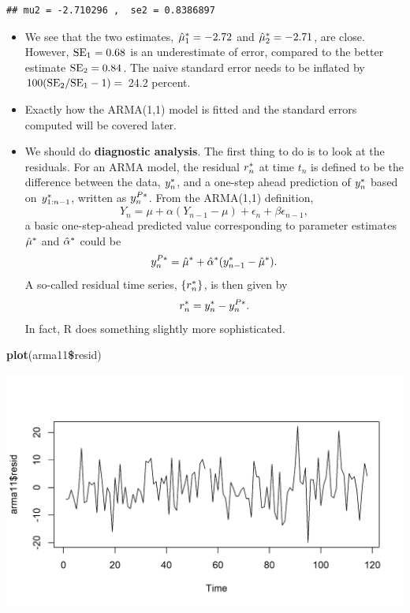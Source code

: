 \documentclass[]{article}
\newenvironment{Shaded}{\begin{snugshade}}{\end{snugshade}}
\newcommand{\KeywordTok}[1]{\textcolor[rgb]{0.13,0.29,0.53}{\textbf{#1}}}
\newcommand{\OperatorTok}[1]{\textcolor[rgb]{0.81,0.36,0.00}{\textbf{#1}}}
\newcommand{\NormalTok}[1]{#1}
\begin{document}
\begin{verbatim}
## mu2 = -2.710296 ,  se2 = 0.8386897
\end{verbatim}

\begin{itemize}
\item
  We see that the two estimates, \(\hat\mu_1^*=-2.72\) and
  \(\hat\mu_2^*=-2.71\), are close. However, \(\mathrm{SE}_1=0.68\) is
  an underestimate of error, compared to the better estimate
  \(\mathrm{SE}_2=0.84\). The naive standard error needs to be inflated by
  \(100(\mathrm{SE}_2/\mathrm{SE}_1-1)=\) 24.2 percent.
\item
  Exactly how the ARMA(1,1) model is fitted and the standard errors
  computed will be covered later.
\item
  We should do \textbf{diagnostic analysis}. The first thing to do is to
  look at the residuals. For an ARMA model, the residual \(r_n^*\)
  at time \(t_n\) is defined to be the difference between the data,
  \(y_n^*\), and a one-step ahead prediction of \(y_n^*\)
  based on \(y_{1:n-1}^*\), written as \(y_n^{P*}\). From the
  ARMA(1,1) definition,
  \[ Y_n = \mu + \alpha(Y_{n-1}-\mu) + \epsilon_n + \beta \epsilon_{n-1},\]
  a basic one-step-ahead predicted value corresponding to parameter
  estimates \(\hat\mu^*\) and \(\hat\alpha^*\) could
  be
  \[y_n^{P*} = \hat{\mu}^* + \hat{\alpha}^*(y_{n-1}^*-\hat{\mu}^*).\]
  A so-called residual time series, \(\{r_n^*\}\), is then given by
  \[ r_n^* = y_n^* - y_n^{P*}.\] In fact, R does
  something slightly more sophisticated.
\end{itemize}

\begin{Shaded}
\begin{Highlighting}[]
\KeywordTok{plot}\NormalTok{(arma11}\OperatorTok{\$}\NormalTok{resid)}
\end{Highlighting}
\end{Shaded}

\begin{center}\includegraphics{figure/intro-arma_diag-1} \end{center}
\end{document}
